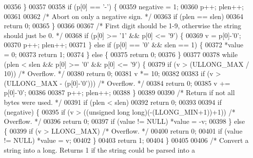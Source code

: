 \begin{DoxyCode}
00356     \}
00357 
00358     \textcolor{keywordflow}{if} (p[0] == \textcolor{stringliteral}{'-'}) \{
00359         negative = 1;
00360         p++; plen++;
00361 
00362         \textcolor{comment}{/* Abort on only a negative sign. */}
00363         \textcolor{keywordflow}{if} (plen == slen)
00364             \textcolor{keywordflow}{return} 0;
00365     \}
00366 
00367     \textcolor{comment}{/* First digit should be 1-9, otherwise the string should just be 0. */}
00368     \textcolor{keywordflow}{if} (p[0] >= \textcolor{stringliteral}{'1'} && p[0] <= \textcolor{stringliteral}{'9'}) \{
00369         v = p[0]-\textcolor{stringliteral}{'0'};
00370         p++; plen++;
00371     \} \textcolor{keywordflow}{else} \textcolor{keywordflow}{if} (p[0] == \textcolor{stringliteral}{'0'} && slen == 1) \{
00372         *value = 0;
00373         \textcolor{keywordflow}{return} 1;
00374     \} \textcolor{keywordflow}{else} \{
00375         \textcolor{keywordflow}{return} 0;
00376     \}
00377 
00378     \textcolor{keywordflow}{while} (plen < slen && p[0] >= \textcolor{stringliteral}{'0'} && p[0] <= \textcolor{stringliteral}{'9'}) \{
00379         \textcolor{keywordflow}{if} (v > (ULLONG\_MAX / 10)) \textcolor{comment}{/* Overflow. */}
00380             \textcolor{keywordflow}{return} 0;
00381         v *= 10;
00382 
00383         \textcolor{keywordflow}{if} (v > (ULLONG\_MAX - (p[0]-\textcolor{stringliteral}{'0'}))) \textcolor{comment}{/* Overflow. */}
00384             \textcolor{keywordflow}{return} 0;
00385         v += p[0]-\textcolor{stringliteral}{'0'};
00386 
00387         p++; plen++;
00388     \}
00389 
00390     \textcolor{comment}{/* Return if not all bytes were used. */}
00391     \textcolor{keywordflow}{if} (plen < slen)
00392         \textcolor{keywordflow}{return} 0;
00393 
00394     \textcolor{keywordflow}{if} (negative) \{
00395         \textcolor{keywordflow}{if} (v > ((\textcolor{keywordtype}{unsigned} \textcolor{keywordtype}{long} \textcolor{keywordtype}{long})(-(LLONG\_MIN+1))+1)) \textcolor{comment}{/* Overflow. */}
00396             \textcolor{keywordflow}{return} 0;
00397         \textcolor{keywordflow}{if} (value != NULL) *value = -v;
00398     \} \textcolor{keywordflow}{else} \{
00399         \textcolor{keywordflow}{if} (v > LLONG\_MAX) \textcolor{comment}{/* Overflow. */}
00400             \textcolor{keywordflow}{return} 0;
00401         \textcolor{keywordflow}{if} (value != NULL) *value = v;
00402     \}
00403     \textcolor{keywordflow}{return} 1;
00404 \}
00405 
00406 \textcolor{comment}{/* Convert a string into a long. Returns 1 if the string could be parsed into a}

\end{DoxyCode}
